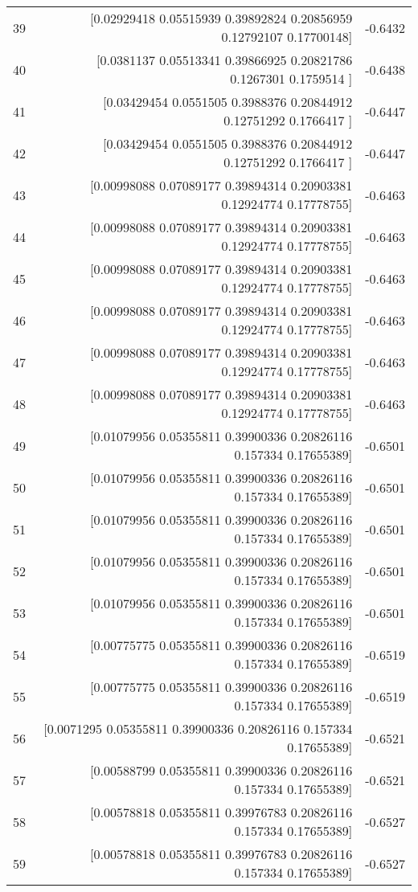 \begin{longtable}{lrr}
39 & [0.02929418 0.05515939 0.39892824 0.20856959 0.12792107 0.17700148] & -0.6432 \\
40 & [0.0381137  0.05513341 0.39866925 0.20821786 0.1267301  0.1759514 ] & -0.6438 \\
41 & [0.03429454 0.0551505  0.3988376  0.20844912 0.12751292 0.1766417 ] & -0.6447 \\
42 & [0.03429454 0.0551505  0.3988376  0.20844912 0.12751292 0.1766417 ] & -0.6447 \\
43 & [0.00998088 0.07089177 0.39894314 0.20903381 0.12924774 0.17778755] & -0.6463 \\
44 & [0.00998088 0.07089177 0.39894314 0.20903381 0.12924774 0.17778755] & -0.6463 \\
45 & [0.00998088 0.07089177 0.39894314 0.20903381 0.12924774 0.17778755] & -0.6463 \\
46 & [0.00998088 0.07089177 0.39894314 0.20903381 0.12924774 0.17778755] & -0.6463 \\
47 & [0.00998088 0.07089177 0.39894314 0.20903381 0.12924774 0.17778755] & -0.6463 \\
48 & [0.00998088 0.07089177 0.39894314 0.20903381 0.12924774 0.17778755] & -0.6463 \\
49 & [0.01079956 0.05355811 0.39900336 0.20826116 0.157334   0.17655389] & -0.6501 \\
50 & [0.01079956 0.05355811 0.39900336 0.20826116 0.157334   0.17655389] & -0.6501 \\
51 & [0.01079956 0.05355811 0.39900336 0.20826116 0.157334   0.17655389] & -0.6501 \\
52 & [0.01079956 0.05355811 0.39900336 0.20826116 0.157334   0.17655389] & -0.6501 \\
53 & [0.01079956 0.05355811 0.39900336 0.20826116 0.157334   0.17655389] & -0.6501 \\
54 & [0.00775775 0.05355811 0.39900336 0.20826116 0.157334   0.17655389] & -0.6519 \\
55 & [0.00775775 0.05355811 0.39900336 0.20826116 0.157334   0.17655389] & -0.6519 \\
56 & [0.0071295  0.05355811 0.39900336 0.20826116 0.157334   0.17655389] & -0.6521 \\
57 & [0.00588799 0.05355811 0.39900336 0.20826116 0.157334   0.17655389] & -0.6521 \\
58 & [0.00578818 0.05355811 0.39976783 0.20826116 0.157334   0.17655389] & -0.6527 \\
59 & [0.00578818 0.05355811 0.39976783 0.20826116 0.157334   0.17655389] & -0.6527 \\

\end{longtable}
